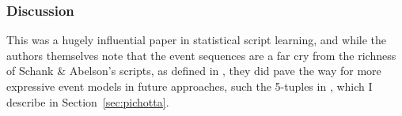 \subsubsection{Discussion}
This was a hugely influential paper in statistical script learning, and while the authors themselves note that the event sequences are a far cry from the richness of Schank \& Abelson's scripts, as defined in \citep{schankandabelson}, they did pave the way for more expressive event models in future approaches, such the 5-tuples in \citep{pichotta2016learning}, which I describe in Section~\ref{sec:pichotta}.



